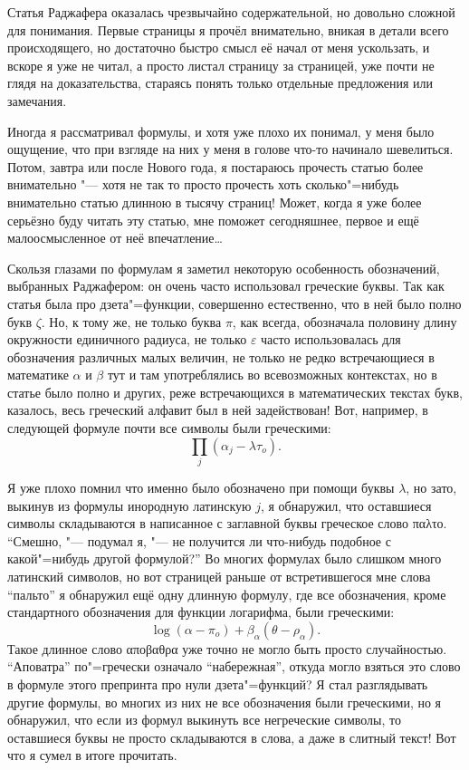 Статья Раджафера оказалась чрезвычайно содержательной, но довольно сложной для
понимания.
Первые страницы я прочёл внимательно, вникая в детали всего происходящего, но
достаточно быстро смысл её начал от меня ускользать, и вскоре я уже не читал, а
просто листал страницу за страницей, уже почти не глядя на доказательства,
стараясь понять только отдельные предложения или замечания.

Иногда я рассматривал формулы, и хотя уже плохо их понимал, у меня было ощущение,
что при взгляде на них у меня в голове что-то начинало шевелиться.
Потом, завтра или после Нового года, я постараюсь прочесть статью более
внимательно "--- хотя не так то просто прочесть хоть сколько"=нибудь внимательно
статью длинною в тысячу страниц!
Может, когда я уже более серьёзно буду читать эту статью, мне поможет
сегодняшнее, первое и ещё малоосмысленное от неё впечатление\ldots

Скользя глазами по формулам я заметил некоторую особенность обозначений,
выбранных Раджафером: он очень часто использовал греческие буквы.
Так как статья была про дзета"=функции, совершенно естественно, что в ней было
полно букв $\zeta$.
Но, к тому же, не только буква $\pi$, как всегда, обозначала половину длину
окружности единичного радиуса, не только $\varepsilon$ часто использовалась для
обозначения различных малых величин, не только не редко встречающиеся в
математике $\alpha$ и $\beta$ тут и там употреблялись во всевозможных контекстах,
но в статье было полно и других, реже встречающихся в математических текстах
букв, казалось, весь греческий алфавит был в ней задействован!
Вот, например, в следующей формуле почти все символы были греческими:
\begin{equation*}
\prod_j\left(\alpha_j - \lambda\tau_o\right).
\end{equation*}

Я уже плохо помнил что именно было обозначено при помощи буквы $\lambda$, но
зато, выкинув из формулы инородную латинскую $j$, я обнаружил, что оставшиеся
символы складываются в написанное с заглавной буквы греческое слово
\foreignlanguage{greek}{παλτο}.
\enquote{Смешно, "--- подумал я, "--- не получится ли что-нибудь подобное с
какой"=нибудь другой формулой?}
Во многих формулах было слишком много латинский символов, но вот страницей
раньше от встретившегося мне слова \enquote{пальто} я обнаружил ещё одну длинную
формулу, где все обозначения, кроме стандартного обозначения для функции
логарифма, были греческими:
\begin{equation*}
\log(\alpha - \pi_o) + \beta_\alpha(\theta - \rho_\alpha).
\end{equation*}
Такое длинное слово \foreignlanguage{greek}{αποβαθρα} уже точно не могло
быть просто случайностью.
\enquote{Аповатра} по"=гречески означало \enquote{набережная}, откуда могло
взяться это слово в формуле этого препринта про нули дзета"=функций?
Я стал разглядывать другие формулы, во многих из них не все обозначения были
греческими, но я обнаружил, что если из формул выкинуть все негреческие символы,
то оставшиеся буквы не просто складываются в слова, а даже в слитный текст!
Вот что я сумел в итоге прочитать.
